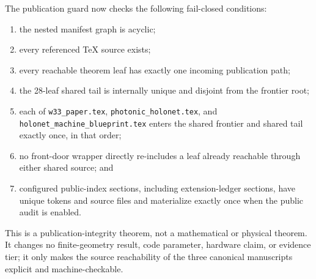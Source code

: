 The publication guard now checks the following fail-closed conditions:
\begin{enumerate}
\item the nested manifest graph is acyclic;
\item every referenced TeX source exists;
\item every reachable theorem leaf has exactly one incoming publication path;
\item the 28-leaf shared tail is internally unique and disjoint from the frontier root;
\item each of \texttt{w33\_paper.tex}, \texttt{photonic\_holonet.tex}, and
      \texttt{holonet\_machine\_blueprint.tex} enters the shared frontier and shared tail
      exactly once, in that order;
\item no front-door wrapper directly re-includes a leaf already reachable through either
      shared source; and
\item configured public-index sections, including extension-ledger sections, have unique
      tokens and source files and materialize exactly once when the public audit is enabled.
\end{enumerate}

This is a publication-integrity theorem, not a mathematical or physical theorem.  It changes
no finite-geometry result, code parameter, hardware claim, or evidence tier; it only makes the
source reachability of the three canonical manuscripts explicit and machine-checkable.

